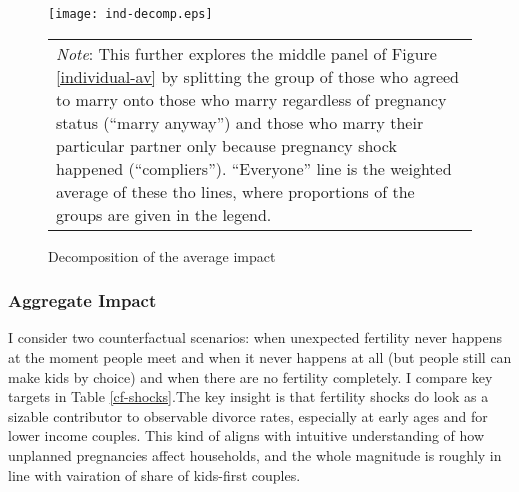 \documentclass[12pt,letter]{article}
\begin{document}
\begin{figure}[h!]
\centering
\texttt{[image: ind-decomp.eps]}
\vspace{-0.5em}
\begin{tabular}{ p{\linewidth} }
\footnotesize \emph{Note}: This further explores the middle panel of Figure \ref{individual-av} by splitting the group of those who agreed to marry onto those who marry regardless of pregnancy status (``marry anyway'') and those who marry their particular partner only because pregnancy shock happened (``compliers''). ``Everyone'' line is the weighted average of these tho lines, where proportions of the groups are given in the legend.
\end{tabular}
\caption{Decomposition of the average impact\label{ind-decomp}}
\end{figure}



\subsubsection{Aggregate Impact}
I consider two counterfactual scenarios: when unexpected fertility never happens at the moment people meet and when it never happens at all (but people still can make kids by choice) and when there are no fertility completely. I compare key targets in Table \ref{cf-shocks}.The key insight is that fertility shocks do look as a sizable contributor to observable divorce rates, especially at early ages and for lower income couples. This kind of aligns with intuitive understanding of how unplanned pregnancies affect households, and the whole magnitude is roughly in line with vairation of share of kids-first couples. 
\end{document}
